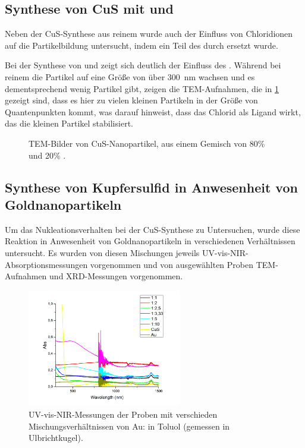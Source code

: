 	

	
	
\subsection{Synthese von CuS mit  und }
	
	Neben der CuS-Synthese aus reinem  wurde auch der Einfluss von Chloridionen auf die Partikelbildung untersucht, indem ein Teil des  durch  ersetzt wurde.
	 
	Bei der Synthese von  und  zeigt sich deutlich der Einfluss des . 
	Während bei reinem  die Partikel auf eine Größe von über \SI{300}{\nano\meter} wachsen und es dementsprechend wenig Partikel gibt, zeigen die TEM-Aufnahmen, die in \cref{fig:TEM-CuCl} gezeigt sind, dass es hier zu vielen kleinen Partikeln in der Größe von Quantenpunkten kommt, was darauf hinweist, dass das Chlorid als Ligand wirkt, das die kleinen Partikel stabilisiert.
	
	\begin{figure}[H]
		\centering
		\caption{TEM-Bilder von CuS-Nanopartikel, aus einem Gemisch von 80\%  und 20\% .}
		\label{fig:TEM-CuCl}
	\end{figure}
	
\subsection{Synthese von Kupfersulfid in Anwesenheit von Goldnanopartikeln}

	Um das Nukleationsverhalten bei der CuS-Synthese zu Untersuchen, wurde diese Reaktion in Anwesenheit von Goldnanopartikeln in verschiedenen Verhältnissen untersucht.
	Es wurden von diesen Mischungen jeweils UV-vis-NIR-Absorptionsmessungen vorgenommen und von ausgewählten Proben TEM-Aufnahmen und XRD-Messungen vorgenommen.
	
	\begin{figure}[htbp]
		\centering
		\includegraphics[width=0.6\textwidth]{Bilder/UV-AuCu-Konz} 	
		\caption{UV-vis-NIR-Messungen der Proben mit verschieden Mischungsverhältnissen von Au: in Toluol (gemessen in Ulbrichtkugel).}
		\label{fig:UV-AuCu}
	\end{figure}
	
